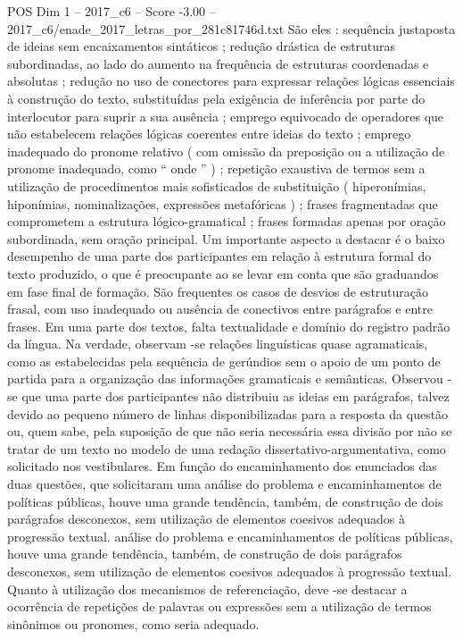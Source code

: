 \begin{textsample}{POS Dim 1 – 2017\_c6 – Score -3.00 – 2017\_c6/enade\_2017\_letras\_por\_281c81746d.txt}
São eles : sequência justaposta de ideias sem encaixamentos sintáticos ; redução drástica de estruturas subordinadas, ao lado do aumento na frequência de estruturas coordenadas e absolutas ; redução no uso de conectores para expressar relações lógicas essenciais à construção do texto, substituídas pela exigência de inferência por parte do interlocutor para suprir a sua ausência ; emprego equivocado de operadores que não estabelecem relações lógicas coerentes entre ideias do texto ; emprego inadequado do pronome relativo ( com omissão da preposição ou a utilização de pronome inadequado, como “ onde ” ) ; repetição exaustiva de termos sem a utilização de procedimentos mais sofisticados de substituição ( hiperonímias, hiponímias, nominalizações, expressões metafóricas ) ; frases fragmentadas que comprometem a estrutura lógico-gramatical ; frases formadas apenas por oração subordinada, sem oração principal.
Um importante aspecto a destacar é o baixo desempenho de uma parte dos participantes em relação à estrutura formal do texto produzido, o que é preocupante ao se levar em conta que são graduandos em fase final de formação.
São frequentes os casos de desvios de estruturação frasal, com uso inadequado ou ausência de conectivos entre parágrafos e entre frases.
Em uma parte dos textos, falta textualidade e domínio do registro padrão da língua.
Na verdade, observam -se relações linguísticas quase agramaticais, como as estabelecidas pela sequência de gerúndios sem o apoio de um ponto de partida para a organização das informações gramaticais e semânticas.
Observou -se que uma parte dos participantes não distribuiu as ideias em parágrafos, talvez devido ao pequeno número de linhas disponibilizadas para a resposta da questão ou, quem sabe, pela suposição de que não seria necessária essa divisão por não se tratar de um texto no modelo de uma redação dissertativo-argumentativa, como solicitado nos vestibulares.
Em função do encaminhamento dos enunciados das duas questões, que solicitaram uma análise do problema e encaminhamentos de políticas públicas, houve uma grande tendência, também, de construção de dois parágrafos desconexos, sem utilização de elementos coesivos adequados à progressão textual. análise do problema e encaminhamentos de políticas públicas, houve uma grande tendência, também, de construção de dois parágrafos desconexos, sem utilização de elementos coesivos adequados à progressão textual.
Quanto à utilização dos mecanismos de referenciação, deve -se destacar a ocorrência de repetições de palavras ou expressões sem a utilização de termos sinônimos ou pronomes, como seria adequado.

\end{textsample}
